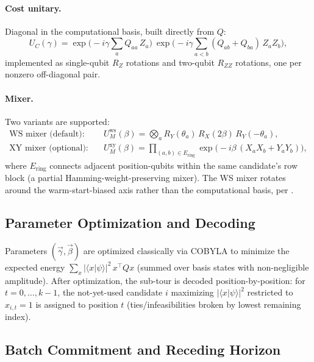 \documentclass[11pt]{article}
\begin{document}
\paragraph{Cost unitary.} Diagonal in the computational basis, built directly from $Q$:
\begin{equation}
  U_C(\gamma) = \exp\!\Big({-}i\gamma \sum_{a} Q_{aa}\, Z_a\Big)\ \exp\!\Big({-}i\gamma \sum_{a<b} (Q_{ab}{+}Q_{ba})\, Z_a Z_b\Big),
\end{equation}
implemented as single-qubit $R_Z$ rotations and two-qubit $R_{ZZ}$ rotations, one per nonzero off-diagonal pair.

\paragraph{Mixer.} Two variants are supported:
\begin{align}
  \text{WS mixer (default):}\quad & U_M^{\mathrm{ws}}(\beta) = \bigotimes_{a} R_Y(\theta_a)\,R_X(2\beta)\,R_Y(-\theta_a), \\
  \text{XY mixer (optional):}\quad & U_M^{\mathrm{xy}}(\beta) = \prod_{(a,b) \in E_{\mathrm{ring}}} \exp\!\big({-}i\beta\,(X_aX_b + Y_aY_b)\big),
\end{align}
where $E_{\mathrm{ring}}$ connects adjacent position-qubits within the same candidate's row block (a partial Hamming-weight-preserving mixer). The WS mixer rotates around the warm-start-biased axis rather than the computational basis, per \cite{egger2021warmstarting}.

\subsection{Parameter Optimization and Decoding}
\label{sec:hybrid-decode}

Parameters $(\vec\gamma,\vec\beta)$ are optimized classically via COBYLA to minimize the expected energy $\sum_x |\langle x|\psi\rangle|^2 \, x^\top Q x$ (summed over basis states with non-negligible amplitude). After optimization, the sub-tour is decoded position-by-position: for $t = 0,\dots,k-1$, the not-yet-used candidate $i$ maximizing $|\langle x | \psi \rangle|^2$ restricted to $x_{i,t}=1$ is assigned to position $t$ (ties/infeasibilities broken by lowest remaining index).

\subsection{Batch Commitment and Receding Horizon}
\label{sec:hybrid-batch}
\end{document}
